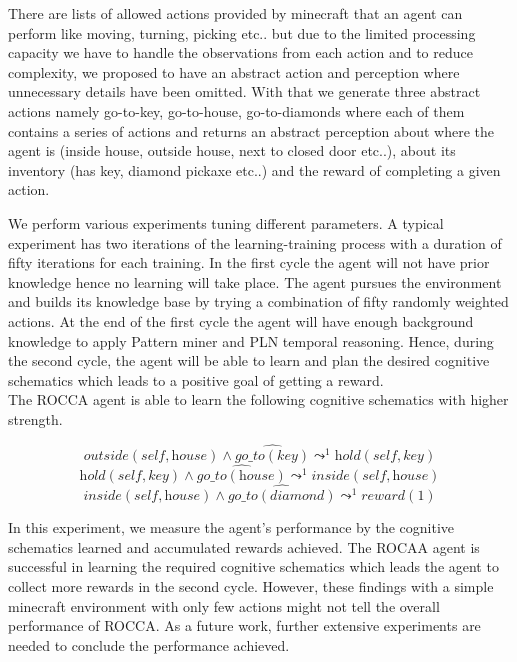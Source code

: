 \documentclass[runningheads]{llncs}
\newcommand{\lpreimp}[1]{\leadsto^{#1}}
\newcommand{\ldo}[1]{\widehat{#1}}
\begin{document}
There are lists of allowed actions provided by minecraft that an agent can perform like moving, turning, picking etc.. but due to the limited processing capacity we have to handle the observations from each action and to reduce complexity, we proposed to have an abstract action and perception where unnecessary details have been omitted. With that we generate three abstract actions namely go-to-key, go-to-house, go-to-diamonds where each of them contains a series of actions and returns an abstract perception about where the agent is (inside house, outside house, next to closed door etc..), about its inventory (has key, diamond pickaxe etc..) and the reward of completing a given action. \par
We perform various experiments tuning different parameters. A typical experiment has two iterations of the learning-training process with a duration of fifty iterations for each training. In the first cycle the agent will not have prior knowledge hence no learning will take place. The agent pursues the environment and builds its knowledge base by trying a combination of fifty randomly weighted actions. At the end of the first cycle the agent will have enough background knowledge to apply Pattern miner and PLN temporal reasoning. Hence, during the second cycle, the agent will be able to learn and plan the desired cognitive schematics which leads to a positive goal of getting a reward.\\
The ROCCA agent is able to learn the following cognitive schematics with higher strength.

$$\textit{outside}(\textit{self}, \textit{house}) \land \ldo{\textit{go\_to}(\textit{key})} \lpreimp{1} \textit{hold}(\textit{self}, \textit{key})$$
$$\textit{hold}(\textit{self}, \textit{key}) \land \ldo{\textit{go\_to}(\textit{house})} \lpreimp{1} \textit{inside}(\textit{self}, \textit{house})$$
$$\textit{inside}(\textit{self}, \textit{house}) \land \ldo{\textit{go\_to}(\textit{diamond})} \lpreimp{1} \textit{reward}(1)$$

In this experiment, we measure the agent's performance by the cognitive schematics learned and accumulated rewards achieved. The ROCAA agent is successful in learning the required cognitive schematics which leads the agent to collect more rewards in the second cycle. However, these findings with a simple minecraft environment with only few actions might not tell the overall performance of ROCCA. As a future work, further extensive experiments are needed to conclude the performance achieved.
\end{document}
